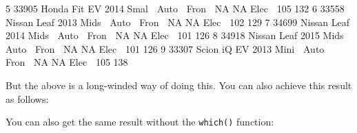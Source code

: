 \documentclass[
]{book}
\newenvironment{Shaded}{\begin{snugshade}}{\end{snugshade}}
\newcommand{\DecValTok}[1]{\textcolor[rgb]{0.00,0.00,0.81}{#1}}
\newcommand{\KeywordTok}[1]{\textcolor[rgb]{0.13,0.29,0.53}{\textbf{#1}}}
\newcommand{\NormalTok}[1]{#1}
\newcommand{\OperatorTok}[1]{\textcolor[rgb]{0.81,0.36,0.00}{\textbf{#1}}}
\newcommand{\OtherTok}[1]{\textcolor[rgb]{0.56,0.35,0.01}{#1}}
\newcommand{\StringTok}[1]{\textcolor[rgb]{0.31,0.60,0.02}{#1}}
\begin{document}
\begin{Shaded}
\begin{Highlighting}[]
\DecValTok{5} \DecValTok{33905}\NormalTok{ Honda     Fit EV    }\DecValTok{2014}\NormalTok{ Smal}\OperatorTok{~}\StringTok{ }\NormalTok{Auto}\OperatorTok{~}\StringTok{ }\NormalTok{Fron}\OperatorTok{~}\StringTok{    }\OtherTok{NA}    \OtherTok{NA}\NormalTok{ Elec}\OperatorTok{~}\StringTok{   }\DecValTok{105}   \DecValTok{132}
\DecValTok{6} \DecValTok{33558}\NormalTok{ Nissan    Leaf      }\DecValTok{2013}\NormalTok{ Mids}\OperatorTok{~}\StringTok{ }\NormalTok{Auto}\OperatorTok{~}\StringTok{ }\NormalTok{Fron}\OperatorTok{~}\StringTok{    }\OtherTok{NA}    \OtherTok{NA}\NormalTok{ Elec}\OperatorTok{~}\StringTok{   }\DecValTok{102}   \DecValTok{129}
\DecValTok{7} \DecValTok{34699}\NormalTok{ Nissan    Leaf      }\DecValTok{2014}\NormalTok{ Mids}\OperatorTok{~}\StringTok{ }\NormalTok{Auto}\OperatorTok{~}\StringTok{ }\NormalTok{Fron}\OperatorTok{~}\StringTok{    }\OtherTok{NA}    \OtherTok{NA}\NormalTok{ Elec}\OperatorTok{~}\StringTok{   }\DecValTok{101}   \DecValTok{126}
\DecValTok{8} \DecValTok{34918}\NormalTok{ Nissan    Leaf      }\DecValTok{2015}\NormalTok{ Mids}\OperatorTok{~}\StringTok{ }\NormalTok{Auto}\OperatorTok{~}\StringTok{ }\NormalTok{Fron}\OperatorTok{~}\StringTok{    }\OtherTok{NA}    \OtherTok{NA}\NormalTok{ Elec}\OperatorTok{~}\StringTok{   }\DecValTok{101}   \DecValTok{126}
\DecValTok{9} \DecValTok{33307}\NormalTok{ Scion     iQ EV     }\DecValTok{2013}\NormalTok{ Mini}\OperatorTok{~}\StringTok{ }\NormalTok{Auto}\OperatorTok{~}\StringTok{ }\NormalTok{Fron}\OperatorTok{~}\StringTok{    }\OtherTok{NA}    \OtherTok{NA}\NormalTok{ Elec}\OperatorTok{~}\StringTok{   }\DecValTok{105}   \DecValTok{138}
\end{Highlighting}
\end{Shaded}

But the above is a long-winded way of doing this. You can also achieve this result as follows:

\begin{Shaded}
\end{Shaded}

You can also get the same result without the \texttt{which()} function:

\begin{Shaded}
\end{Shaded}
\end{document}
